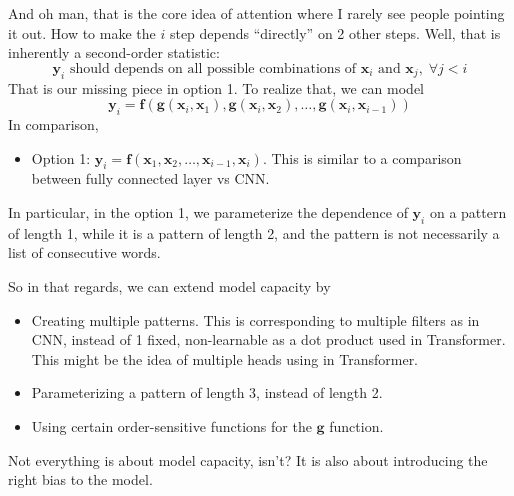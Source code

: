 \documentclass[11pt,a4paper]{article}
\begin{document}
And oh man, that is the core idea of attention where I rarely see people pointing it out. How to make the $i$ step depends ``directly'' on 2 other steps. Well, that is inherently a second-order statistic:
\[
\bm{y}_i \text{ should depends on all possible combinations of } \bm{x}_i \text{ and }\bm{x}_j, \; \forall j < i
\] 
That is our missing piece in option 1.
To realize that, we can model
\[
\bm{y}_i = \bm{f}(\bm{g}(\bm{x}_i, \bm{x}_1), \bm{g}(\bm{x}_i, \bm{x}_2), \ldots , \bm{g}(\bm{x}_i, \bm{x}_{i-1}))
\] 
In comparison,
\begin{itemize}
    \item Option 1: $\bm{y}_i = \bm{f}(\bm{x}_1, \bm{x}_2, \ldots , \bm{x}_{i-1}, \bm{x}_i)$.
        This is similar to a comparison between fully connected layer vs CNN.
\end{itemize}
In particular, in the option 1, we parameterize the dependence of $\bm{y}_i$ on a pattern of length 1, while it is a pattern of length 2, and the pattern is not necessarily a list of consecutive words.

So in that regards, we can extend model capacity by 
\begin{itemize}
    \item Creating multiple patterns. This is corresponding to multiple filters as in CNN, instead of 1 fixed, non-learnable as a dot product used in Transformer. This might be the idea of multiple heads using in Transformer.
    \item Parameterizing a pattern of length 3, instead of length 2.
    \item Using certain order-sensitive functions for the $\bm{g}$ function.
\end{itemize}

Not everything is about model capacity, isn't? It is also about introducing the right bias to the model.
\end{document}

